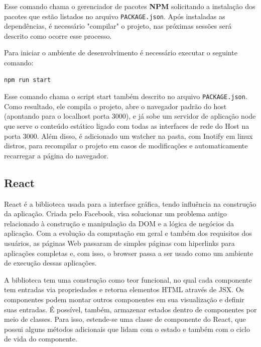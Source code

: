 \documentclass[rel_mlp]{iiufrgs}
\begin{document}
Esse comando chama o gerenciador de pacotes \textbf{NPM} solicitando a instalação dos pacotes que estão listados no arquivo \verb|PACKAGE.json|. Após instaladas as dependências, é necessário "compilar" o projeto, nas próximas sessões será descrito como ocorre esse processo. \par
Para iniciar o ambiente de desenvolvimento é necessário executar o seguinte comando:

\begin{lstlisting}[language=JavaScript]
  npm run start
\end{lstlisting}

Esse comando chama o script start também descrito no arquivo \verb|PACKAGE.json|. Como resultado, ele compila o projeto, abre o navegador padrão do host (apontando para o localhost porta 3000), e já sobe um servidor de aplicação node que serve o conteúdo estático ligado com todas as interfaces de rede do Host na porta 3000. Além disso, é adicionado um watcher na pasta, com Inotify em linux distros, para recompilar o projeto em casos de modificações e automaticamente recarregar a página do navegador.

\subsection{React}
React é a biblioteca usada para a interface gráfica, tendo influência na construção da aplicação. Criada pelo Facebook, visa solucionar um problema antigo relacionado à construção e manipulação da DOM e a lógica de negócios da aplicação. Com a evolução da computação em geral e também dos requisitos dos usuários, as páginas Web passaram de simples páginas com hiperlinks para aplicações completas e, com isso, o browser passa a ser usado como um ambiente de execução dessas aplicações. \par
A biblioteca tem uma construção como teor funcional, no qual cada componente tem entradas via propriedades e retorna elementos HTML através de JSX. Os componentes podem montar outros componentes em sua visualização e definir suas entradas. É possível, também, armazenar estados dentro de componentes por meio de classes. Para isso, estende-se uma classe de componente do React, que possui alguns métodos adicionais que lidam com o estado e também com o ciclo de vida do componente.
\end{document}
